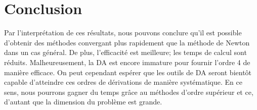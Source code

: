 


{\co
\section{Conclusion}
Par l'interpr\'etation de ces r\'esultats, nous pouvons conclure qu'il est possible d'obtenir des m\'ethodes convergant plus rapidement
que la m\'ethode de Newton dans un cas g\'en\'eral. De plus, l'efficacit\'e est meilleure; les temps de calcul sont r\'eduits. Malheureusement,
la DA est encore immature pour fournir l'ordre 4 de mani\`ere efficace. On peut cependant esp\'erer que les outils de DA seront bientôt capable
d'atteindre ces ordres de d\'erivations de mani\`ere syst\'ematique. En ce sens, nous pourrons gagner du temps grâce au m\'ethodes d'ordre sup\'erieur
et ce, d'autant que la dimension du probl\`eme est grande.
}
